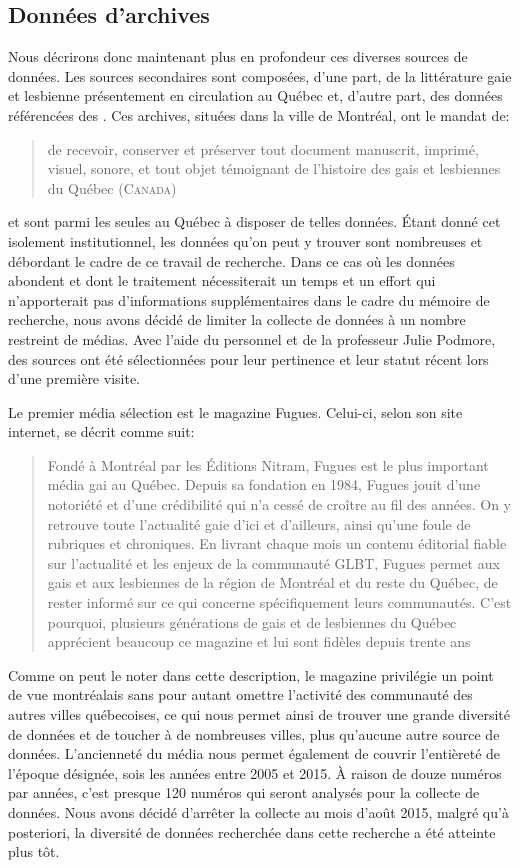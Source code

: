 \subsection{Données d'archives}
\label{sub:donn_es_d_archives}
Nous décrirons donc maintenant plus en profondeur ces diverses sources de données. 
Les sources secondaires sont composées, d'une part, de la littérature gaie et lesbienne présentement en circulation au Québec et, d'autre part, des données référencées des \agq{}. 
Ces archives, situées dans la ville de Montréal, ont le mandat de: \blockquote[{\cite{LAGQ2014}}][.]{\textelp{} de recevoir,   conserver et préserver tout document manuscrit, imprimé, visuel, sonore, et   tout objet témoignant de l'histoire des gais et lesbiennes du Québec   (\textsc{Canada})} et sont parmi les seules au Québec à disposer de telles données. 
Étant donné cet isolement institutionnel, les données qu'on peut y trouver sont nombreuses et débordant le cadre de ce travail de recherche. 
Dans ce cas où les données abondent et dont le traitement nécessiterait un temps et un effort qui n'apporterait pas d'informations supplémentaires dans le cadre du mémoire de recherche, nous avons décidé de limiter la collecte de données à un nombre restreint de médias. 
Avec l'aide du personnel et de la professeur Julie Podmore, des sources ont été sélectionnées pour leur pertinence et leur statut récent lors d'une première visite.

Le premier média sélection est le magazine Fugues. 
Celui-ci, selon son site internet, se décrit comme suit: \blockquote[{\cite{LesNitram2015}}][.]{
  Fondé à Montréal par les Éditions Nitram, Fugues est le plus important média gai au Québec. 
Depuis sa fondation en 1984, Fugues jouit d’une notoriété et d’une crédibilité qui n’a cessé de croître au fil des années. 
On y retrouve toute l’actualité gaie d’ici et d’ailleurs, ainsi qu'une foule de rubriques et chroniques. 
En livrant chaque mois un contenu éditorial fiable sur l’actualité et les enjeux de la communauté GLBT, Fugues permet aux gais et aux lesbiennes de la région de Montréal et du reste du Québec, de rester informé sur ce qui concerne spécifiquement leurs communautés. 
C’est pourquoi, plusieurs générations de gais et de lesbiennes du Québec apprécient beaucoup ce magazine et lui sont fidèles depuis trente ans} 
Comme on peut le noter dans cette description, le magazine privilégie un point de vue montréalais sans pour autant omettre l'activité des communauté \lgbt{} des autres villes québecoises, ce qui nous permet ainsi de trouver une grande diversité de données et de toucher à de nombreuses villes, plus qu'aucune autre source de données. 
L'ancienneté du média nous permet également de couvrir l'entièreté de l'époque désignée, sois les années entre 2005 et 2015. 
À raison de douze numéros par années, c'est presque 120 numéros qui seront analysés pour la collecte de données. 
Nous avons décidé d'arrêter la collecte au mois d'août 2015, malgré qu'à posteriori, la diversité de données recherchée dans cette recherche a été atteinte plus tôt.

